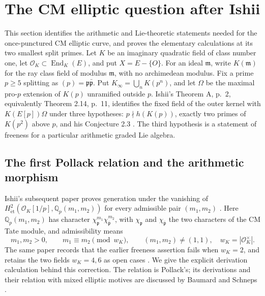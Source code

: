 \section{The CM elliptic question after Ishii}
\label{sec:cm-audit}

This section identifies the arithmetic and Lie-theoretic statements
needed for the once-punctured CM elliptic curve, and proves the elementary
calculations at its two smallest split primes.
Let \(K\) be an imaginary quadratic field of class number one, let
\(\mathcal O_K\subset\operatorname{End}_K(E)\), and put \(X=E-\{O\}\).
For an ideal \(\mathfrak m\), write \(K(\mathfrak m)\) for the ray class
field of modulus \(\mathfrak m\), with no archimedean modulus. Fix a prime
\(p\geq5\) splitting as \((p)=\mathfrak p\bar{\mathfrak p}\).
Put \(K_\infty=\bigcup_nK(p^n)\), and let \(\Omega\) be the maximal
pro-\(p\) extension of \(K(p)\) unramified outside \(p\).
Ishii's Theorem A, p.~2, equivalently Theorem 2.14, p.~11,
identifies the fixed field of the outer kernel with \(K(E[p])\Omega\)
under three hypotheses: \(p\nmid h(K(p))\), exactly two primes of
\(K(p^2)\) above \(p\), and his Conjecture 2.3
\cite{Ishii}. The third hypothesis is a statement of freeness
for a particular arithmetic graded Lie algebra.

\subsection{The first Pollack relation and the arithmetic morphism}

Ishii's subsequent paper proves generation under the vanishing of
\(H^2_{\mathrm{\acute et}}(\mathcal O_K[1/p],\mathbb Q_p(m_1,m_2))\)
for every admissible pair \((m_1,m_2)\)
\cite[Theorem 1.2, p.~3]{IshiiLie}. Here
\(\mathbb Q_p(m_1,m_2)\) has character
\(\chi_{\mathfrak p}^{m_1}\chi_{\bar{\mathfrak p}}^{m_2}\), with
\(\chi_{\mathfrak p}\) and \(\chi_{\bar{\mathfrak p}}\) the two
characters of the CM Tate module, and admissibility means
\[
 m_1,m_2>0,\qquad m_1\equiv m_2\pmod {w_K},\qquad
 (m_1,m_2)\ne(1,1),
 \quad w_K=|\mathcal O_K^\times|.
\]
The same paper records that the earlier freeness assertion fails
when \(w_K=2\), and retains the two fields \(w_K=4,6\) as open cases
\cite[Former Conjecture 1.8, p.~4, and Remark 1.9, p.~5]{IshiiLie}.
We give the explicit derivation calculation behind this correction.
The relation is Pollack's; its derivations and their relation with
mixed elliptic motives are discussed by Baumard and Schneps
\cite[pp.~2--3]{BaumardSchneps}.

